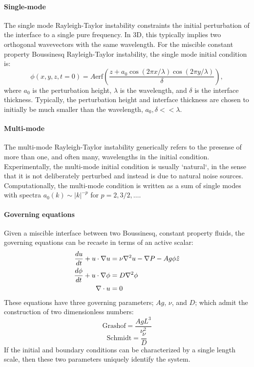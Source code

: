 \paragraph{Single-mode}
The single mode Rayleigh-Taylor instability constraints the initial perturbation of the interface to a single pure frequency.
In 3D, this typically implies two orthogonal wavevectors with the same wavelength.
For the miscible constant property Boussinesq Rayleigh-Taylor instability, the single mode initial condition is:
\begin{equation}
\phi(x,y,z,t=0) = A \text{erf}\left(\frac{z + a_0 \cos(2 \pi x / \lambda) \cos(2 \pi y/\lambda)}{\delta}\right),
\end{equation}
where $a_0$ is the perturbation height,
$\lambda$ is the wavelength, and
$\delta$ is the interface thickness.
Typically, the perturbation height and interface thickness are chosen to initially be much smaller than the wavelength, $a_0, \delta << \lambda$.

\paragraph{Multi-mode}
The multi-mode Rayleigh-Taylor instability generically refers to the presense of more than one, and often many, wavelengths in the initial condition.
Experimentally, the multi-mode initial condition is usually `natural`, in the sense that it is not deliberately perturbed and instead is due to natural noise sources.
Computationally, the multi-mode condition is written as a sum of single modes with spectra $a_0(k) \sim |k|^{-p}$ for $p = 2, 3/2, \ldots$.

\paragraph{Governing equations}
Given a miscible interface between two Boussinesq,  constant property fluids, the governing equations can be recaste in terms of an active scalar:
\begin{align}
\frac{d u}{d t} + u \cdot \nabla u &= \nu \nabla^2 u - \nabla P - A g \phi \hat{z}\\
\frac{d \phi}{d t} + u \cdot \nabla \phi &= D \nabla^2 \phi \\
\nabla \cdot u  &= 0
\end{align}
These equations have three governing parameters; $Ag$, $\nu$, and $D$; which admit the construction of two dimensionless numbers:
\begin{equation}
\text{Grashof} = \frac{Ag L^3}{\nu^2}
\end{equation}
\begin{equation}
\text{Schmidt} = \frac{\nu}{D}
\end{equation}
If the initial and boundary conditions can be characterized by a single length scale, then these two parameters uniquely identify the system.

